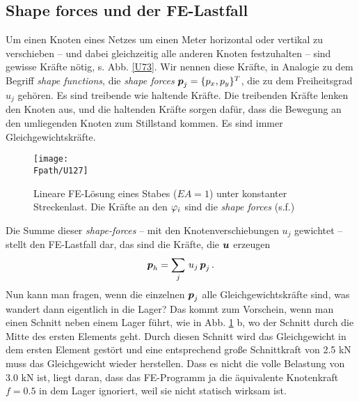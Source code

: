{\textcolor{sectionTitleBlue}{\section{Shape forces und der FE-Lastfall}}}
Um einen Knoten eines Netzes um einen Meter horizontal oder vertikal zu verschieben -- und dabei gleichzeitig alle anderen Knoten festzuhalten -- sind gewisse Kr\"{a}fte n\"{o}tig, s. Abb. \ref{U73}. Wir nennen diese Kr\"{a}fte, in Analogie zu dem Begriff {\em shape functions\/}, die {\em shape forces\/} $\mbox{\boldmath $p$}_j = \{p_x, p_y\}^T$, die zu dem Freiheitsgrad $u_j$ geh\"{o}ren. Es sind treibende wie haltende Kr\"{a}fte. Die treibenden Kr\"{a}fte lenken den Knoten aus, und die haltenden Kr\"{a}fte sorgen daf\"{u}r, dass die Bewegung an den umliegenden Knoten zum Stillstand kommen. Es sind immer Gleichgewichtskr\"{a}fte.
\begin{figure}[tbp]
\centering
\if {} \sidecaption \fi
\texttt{[image: \\Fpath/U127]}
\caption{Lineare FE-L\"{o}sung eines Stabes ($EA = 1$) unter konstanter Streckenlast. Die Kr\"{a}fte an den $\varphi_i$ sind die {\em shape forces\/} (s.f.)} \label{U127}
\end{figure}%

Die Summe dieser {\em shape-forces\/} -- mit den Knotenverschiebungen $u_j$ gewich\-tet -- stellt den FE-Lastfall dar, das sind die Kr\"{a}fte, die $\mbox{\boldmath $u$}$ erzeugen
\begin{align}\label{Eq70}
\mbox{\boldmath $p$}_h = \sum_j\,u_j\,\mbox{\boldmath $p$}_j\,.
\end{align}
Nun kann man fragen, wenn die einzelnen $\mbox{\boldmath $p$}_j$ alle Gleichgewichtskr\"{a}fte sind, was wandert dann eigentlich in die Lager? Das kommt zum Vorschein, wenn man einen Schnitt neben einem Lager f\"{u}hrt, wie in Abb. \ref{U127} b, wo der Schnitt durch die Mitte des ersten Elements geht. Durch diesen Schnitt wird das Gleichgewicht in dem ersten Element gest\"{o}rt und eine entsprechend gro{\ss}e Schnittkraft von 2.5 kN muss das Gleichgewicht wieder herstellen. Dass es nicht die volle Belastung von 3.0 kN ist, liegt daran, dass das FE-Programm ja die \"{a}quivalente Knotenkraft $f = 0.5$ in dem Lager ignoriert, weil sie nicht statisch wirksam ist.

